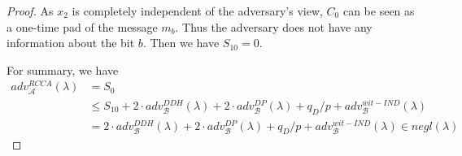 \begin{proof}
  As $x_2$ is completely independent of the adversary's view, $C_0$ can be seen as a one-time pad of the message $m_b$. Thus the adversary does not have any information about the bit $b$. Then we have $S_{10} = 0$.

  For summary, we have
  \begin{align*}
    adv_{\mathcal{A}}^{RCCA}(\lambda) &= S_0\\
    &\leq S_{10} + 2 \cdot adv_{\mathcal{B}}^{DDH}(\lambda) + 2 \cdot adv_{\mathcal{B}}^{DP}(\lambda) + q_D/p + adv_{\mathcal{B}}^{wit-IND}(\lambda)\\
    &= 2 \cdot adv_{\mathcal{B}}^{DDH}(\lambda) + 2 \cdot adv_{\mathcal{B}}^{DP}(\lambda) + q_D/p + adv_{\mathcal{B}}^{wit-IND}(\lambda) \in negl(\lambda)
  \end{align*}
\end{proof}


